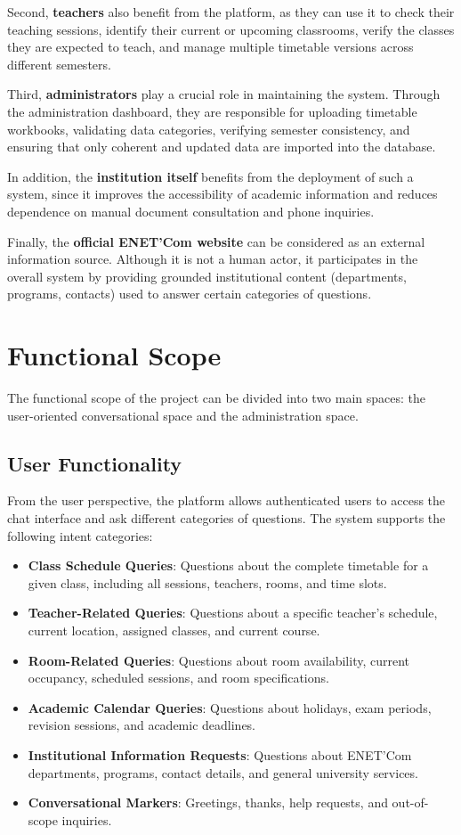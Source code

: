 Second, \textbf{teachers} also benefit from the platform, as they can use it to check their teaching sessions, identify their current or upcoming classrooms, verify the classes they are expected to teach, and manage multiple timetable versions across different semesters.

Third, \textbf{administrators} play a crucial role in maintaining the system. Through the administration dashboard, they are responsible for uploading timetable workbooks, validating data categories, verifying semester consistency, and ensuring that only coherent and updated data are imported into the database.

In addition, the \textbf{institution itself} benefits from the deployment of such a system, since it improves the accessibility of academic information and reduces dependence on manual document consultation and phone inquiries.

Finally, the \textbf{official ENET'Com website} can be considered as an external information source. Although it is not a human actor, it participates in the overall system by providing grounded institutional content (departments, programs, contacts) used to answer certain categories of questions.

\section{Functional Scope}
The functional scope of the project can be divided into two main spaces: the user-oriented conversational space and the administration space.

\subsection{User Functionality}
From the user perspective, the platform allows authenticated users to access the chat interface and ask different categories of questions. The system supports the following intent categories:

\begin{itemize}
    \item \textbf{Class Schedule Queries}: Questions about the complete timetable for a given class, including all sessions, teachers, rooms, and time slots.
    \item \textbf{Teacher-Related Queries}: Questions about a specific teacher's schedule, current location, assigned classes, and current course.
    \item \textbf{Room-Related Queries}: Questions about room availability, current occupancy, scheduled sessions, and room specifications.
    \item \textbf{Academic Calendar Queries}: Questions about holidays, exam periods, revision sessions, and academic deadlines.
    \item \textbf{Institutional Information Requests}: Questions about ENET'Com departments, programs, contact details, and general university services.
    \item \textbf{Conversational Markers}: Greetings, thanks, help requests, and out-of-scope inquiries.
\end{itemize}

